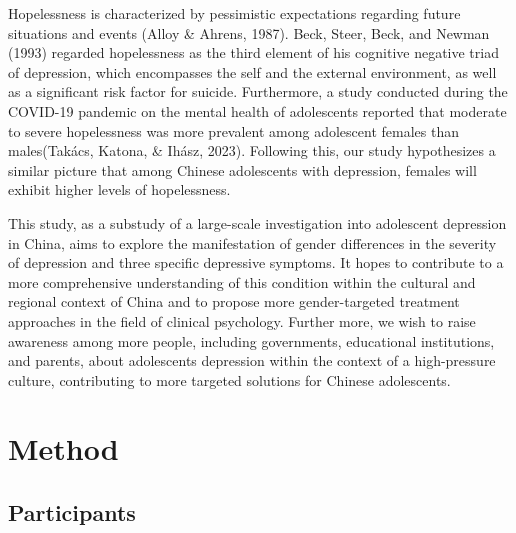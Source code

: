 \documentclass[
  man,floatsintext]{apa6}
\begin{document}
Hopelessness is characterized by pessimistic expectations regarding future situations and events (Alloy \& Ahrens, 1987). Beck, Steer, Beck, and Newman (1993) regarded hopelessness as the third element of his cognitive negative triad of depression, which encompasses the self and the external environment, as well as a significant risk factor for suicide. Furthermore, a study conducted during the COVID-19 pandemic on the mental health of adolescents reported that moderate to severe hopelessness was more prevalent among adolescent females than males(Takács, Katona, \& Ihász, 2023). Following this, our study hypothesizes a similar picture that among Chinese adolescents with depression, females will exhibit higher levels of hopelessness.

This study, as a substudy of a large-scale investigation into adolescent depression in China, aims to explore the manifestation of gender differences in the severity of depression and three specific depressive symptoms. It hopes to contribute to a more comprehensive understanding of this condition within the cultural and regional context of China and to propose more gender-targeted treatment approaches in the field of clinical psychology. Further more, we wish to raise awareness among more people, including governments, educational institutions, and parents, about adolescents depression within the context of a high-pressure culture, contributing to more targeted solutions for Chinese adolescents.

\hypertarget{method}{%
\section{Method}\label{method}}

\hypertarget{participants}{%
\subsection{Participants}\label{participants}}
\end{document}
